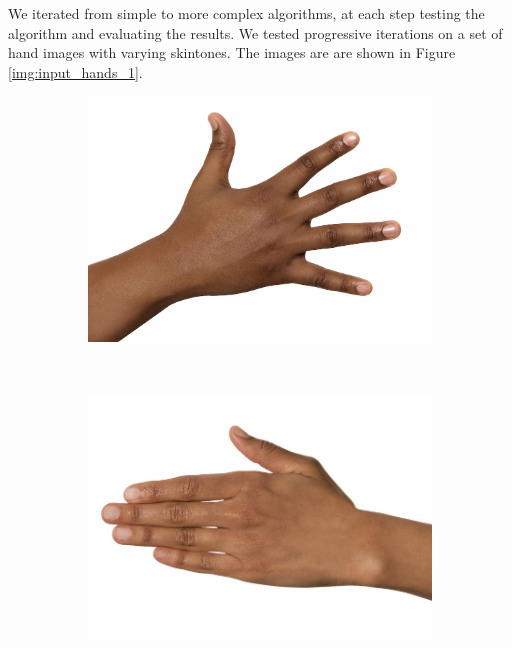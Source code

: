 \documentclass[12pt, a4paper]{article}
\begin{document}
We iterated from simple to more complex algorithms, at each step testing the algorithm and evaluating the results. We tested progressive iterations on a set of hand images with varying skintones. The images are are shown in Figure \ref{img:input_hands_1}.


\begin{figure}[H]
    \centering
    \begin{subfigure}[b]{0.20\textwidth}
        \includegraphics[width=\textwidth]{images/hand_dark}
        \caption{}\label{img:input_hands_1_dark}
    \end{subfigure}
    ~
    \begin{subfigure}[b]{0.20\textwidth}
        \includegraphics[width=\textwidth]{images/hand_brown}

\end{subfigure}
\end{figure}
\end{document}
